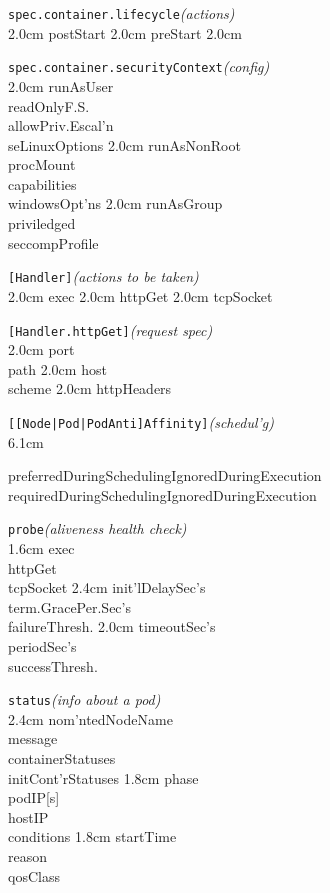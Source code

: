 \texttt{spec.container.lifecycle}\quad\textit{(actions)}\\[-2mm]
\api
{2.0cm}{
postStart
}
{2.0cm}{
preStart
}
{2.0cm}{

}
\stopapi


\texttt{spec.container.securityContext}\quad\textit{(config)}\\[-2mm]
\api
{2.0cm}{
runAsUser           \\
readOnlyF.S.        \\
allowPriv.Escal'n   \\
seLinuxOptions      
}
{2.0cm}{
runAsNonRoot        \\
procMount           \\
capabilities        \\
windowsOpt'ns      
}
{2.0cm}{
runAsGroup          \\
priviledged         \\
seccompProfile      
}
\stopapi


\texttt{[Handler]}\quad\textit{(actions to be taken)}\\[-2mm]
\api
{2.0cm}{
exec        
}
{2.0cm}{
httpGet     
}
{2.0cm}{
tcpSocket   
}
\stopapi


\texttt{[Handler.httpGet]}\quad\textit{(request spec)}\\[-2mm]
\api
{2.0cm}{
port        \\
path        
}
{2.0cm}{
host        \\
scheme      
}
{2.0cm}{
httpHeaders 
}
\stopapi


\texttt{[[Node|Pod|PodAnti]Affinity]}\quad\textit{(schedul'g)}\\[-2mm]
\api
{6.1cm}{
preferredDuringSchedulingIgnoredDuringExecution \\
requiredDuringSchedulingIgnoredDuringExecution 

}
\stopapi


\texttt{probe}\quad\textit{(aliveness health check)}\\[-2mm]
\api
{1.6cm}{
exec            \\
httpGet         \\
tcpSocket       
}
{2.4cm}{
init'lDelaySec's    \\
term.GracePer.Sec's \\
failureThresh.  
}
{2.0cm}{
timeoutSec's    \\
periodSec's     \\
successThresh.  
}
\stopapi




\texttt{status}\quad\textit{(info about a pod)}\\[-2mm]
\api
{2.4cm}{
nom'ntedNodeName    \\
message             \\
containerStatuses   \\
initCont'rStatuses  
}
{1.8cm}{
phase               \\
podIP[s]            \\
hostIP              \\
conditions          
}
{1.8cm}{
startTime           \\
reason              \\
qosClass            
}
\stopapi

